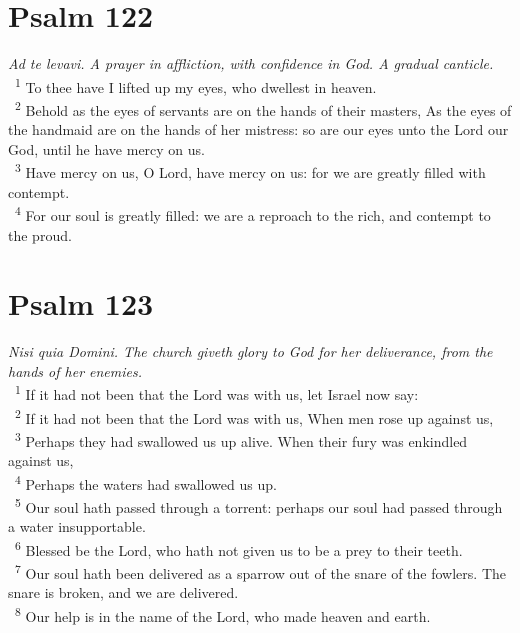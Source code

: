 \documentclass[a5paper,12pt]{article}
\begin{document}
\begin{multicols*}{2}
\section{Psalm 122}
\label{sec:org4376480}
\emph{Ad te levavi. A prayer in affliction, with confidence in God. A gradual canticle.}\\

~\textsuperscript{1} To thee have I lifted up my eyes, who dwellest in heaven.\\
~\textsuperscript{2} Behold as the eyes of servants are on the hands of their masters, As the eyes of the handmaid are on the hands of her mistress: so are our eyes unto the Lord our God, until he have mercy on us.\\
~\textsuperscript{3} Have mercy on us, O Lord, have mercy on us: for we are greatly filled with contempt.\\
~\textsuperscript{4} For our soul is greatly filled: we are a reproach to the rich, and contempt to the proud.\\

\section{Psalm 123}
\label{sec:org22f51df}
\emph{Nisi quia Domini. The church giveth glory to God for her deliverance, from the hands of her enemies.}\\

~\textsuperscript{1} If it had not been that the Lord was with us, let Israel now say:\\
~\textsuperscript{2} If it had not been that the Lord was with us, When men rose up against us,\\
~\textsuperscript{3} Perhaps they had swallowed us up alive. When their fury was enkindled against us,\\
~\textsuperscript{4} Perhaps the waters had swallowed us up.\\
~\textsuperscript{5} Our soul hath passed through a torrent: perhaps our soul had passed through a water insupportable.\\
~\textsuperscript{6} Blessed be the Lord, who hath not given us to be a prey to their teeth.\\
~\textsuperscript{7} Our soul hath been delivered as a sparrow out of the snare of the fowlers. The snare is broken, and we are delivered.\\
~\textsuperscript{8} Our help is in the name of the Lord, who made heaven and earth.\\


\end{multicols*}
\end{document}
